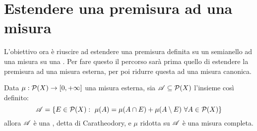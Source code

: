 \section{Estendere una premisura ad una misura}
L'obiettivo ora è riuscire ad estendere una premisura definita su un semianello ad una misura su una \sigalg{}. Per fare questo il percorso sarà prima quello di estendere la premisura ad una misura esterna, per poi ridurre questa ad una misura canonica.


\begin{theorem}\label{RiduzionePreCaratheodory}
	Data $\mu:\mathcal P(X)\to [0,+\infty]$ una misura esterna, sia $\mathscr A\subseteq \mathcal P(X)$ l'insieme così definito:
	\begin{equation*}
		\mathscr A=\{E\in\mathcal P(X):\ \mu(A)=\mu(A\cap E)+\mu(A\setminus E)\ \forall A\in \mathcal P(X)\}
	\end{equation*}
	allora $\mathscr A$ è una \sigalg{}, detta \sigalg{} di Caratheodory, e $\mu$ ridotta su $\mathscr A$ è una misura completa.
\end{theorem}
